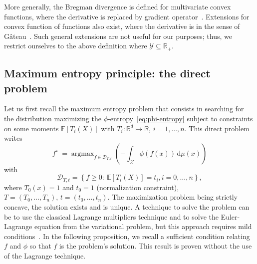\documentclass[entropy,article,submit,moreauthors,pdftex]{Definitions/mdpi}
\def\dmu{\mathrm{d}\mu}%
\def\Rset{\mathbb{R}}%
\def\X{\mathcal{X}}%
\def\Y{\mathcal{Y}}%
\def\D{\mathcal{D}}%
\DeclareMathOperator*{\argmax}{\operatorname{argmax}}%
\newcommand{\Esp}[1]{\mathbb{E}\left[ #1 \right]}%
\begin{document}
More  generally,  the Bregman  divergence  is  defined for  multivariate  convex
functions,     where    the     derivative    is     replaced    by     gradient
operator~\cite{Bre67}. Extensions  for convex function of  functions also exist,
where the derivative  is in the sense of  G\^ateau~\cite{NieNoc17}. Such general
extensions are not  useful for our purposes; thus, we  restrict ourselves to the
above definition where $\Y \subseteq \Rset_+$.




\subsection{Maximum entropy principle: the direct problem}
\label{subsec:MaxPhiEntDirect}

Let us first  recall the maximum entropy problem that  consists in searching for
the distribution maximizing the $\phi$-entropy~\eqref{eq:phi-entropy} subject to
constraints on  some moments $\Esp{T_i(X)}$  with $T_i: \Rset^d  \mapsto \Rset$,
$i=1,\ldots,n$. This direct problem writes
%
\begin{equation}\label{eq:MaxEnt}
\displaystyle f^\star \: = \argmax_{f  \in \D_{T,t}} \left( - \int_\X \phi(f(x))
\, \dmu(x) \right)
\end{equation}
%
with
%
\begin{equation}\label{eq:Ct}
\D_{T,t} = \left\{ f \ge 0: \: \Esp{T_i(X)} = t_i, i=0,\ldots,n\right\},
\end{equation}
%
where $T_0(x) = 1$ and $t_0 =  1$ (normalization constraint), $T = (T_0 , \ldots
, T_n), \, t  = (t_0 , \ldots , t_n)$.  The  maximization problem being strictly
concave, the solution exists and is unique. A technique to solve the problem can
be  to  use the  classical  Lagrange  multipliers  technique  and to  solve  the
Euler-Lagrange equation from the variational problem, but this approach requires
mild  conditions~\cite{KesKap89,  BorLew91:03,   BorLew93,  BenBor92,  TebVaj93,
  Gir97}.   In  the following  proposition,  we  recall a  sufficient  condition
relating $f$ and $\phi$  so that $f$ is the problem's  solution.  This result is
proven without the use of the Lagrange technique.
\end{document}
